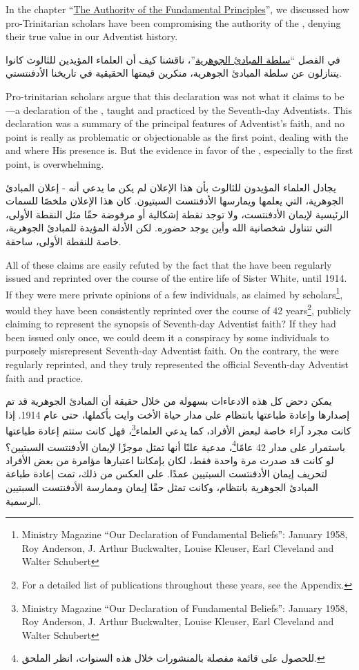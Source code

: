 In the chapter “\hyperref[chap:authority]{The Authority of the Fundamental Principles}”, we discussed how pro-Trinitarian scholars have been compromising the authority of the , denying their true value in our Adventist history.


في الفصل “\hyperref[chap:authority]{سلطة المبادئ الجوهرية}”، ناقشنا كيف أن العلماء المؤيدين للثالوث كانوا يتنازلون عن سلطة المبادئ الجوهرية، منكرين قيمتها الحقيقية في تاريخنا الأدفنتستي.


Pro-trinitarian scholars argue that this declaration was not what it claims to be—a declaration of the , taught and practiced by the Seventh-day Adventists. This declaration was a summary of the principal features of Adventist’s faith, and no point is really as problematic or objectionable as the first point, dealing with the  and where His presence is. But the evidence in favor of the , especially to the first point, is overwhelming.


يجادل العلماء المؤيدون للثالوث بأن هذا الإعلان لم يكن ما يدعي أنه - إعلان المبادئ الجوهرية، التي يعلمها ويمارسها الأدفنتست السبتيون. كان هذا الإعلان ملخصًا للسمات الرئيسية لإيمان الأدفنتست، ولا توجد نقطة إشكالية أو مرفوضة حقًا مثل النقطة الأولى، التي تتناول شخصانية الله وأين يوجد حضوره. لكن الأدلة المؤيدة للمبادئ الجوهرية، خاصة للنقطة الأولى، ساحقة.


All of these claims are easily refuted by the fact that the  have been regularly issued and reprinted over the course of the entire life of Sister White, until 1914. If they were mere private opinions of a few individuals, as claimed by scholars\footnote{Ministry Magazine “Our Declaration of Fundamental Beliefs”: January 1958, Roy Anderson, J. Arthur Buckwalter, Louise Kleuser, Earl Cleveland and Walter Schubert}, would they have been consistently reprinted over the course of 42 years\footnote{For a detailed list of publications throughout these years, see the Appendix.}, publicly claiming to represent the synopsis of Seventh-day Adventist faith? If they had been issued only once, we could deem it a conspiracy by some individuals to purposely misrepresent Seventh-day Adventist faith. On the contrary, the  were regularly reprinted, and they truly represented the official Seventh-day Adventist faith and practice.


يمكن دحض كل هذه الادعاءات بسهولة من خلال حقيقة أن المبادئ الجوهرية قد تم إصدارها وإعادة طباعتها بانتظام على مدار حياة الأخت وايت بأكملها، حتى عام 1914. إذا كانت مجرد آراء خاصة لبعض الأفراد، كما يدعي العلماء\footnote{Ministry Magazine “Our Declaration of Fundamental Beliefs”: January 1958, Roy Anderson, J. Arthur Buckwalter, Louise Kleuser, Earl Cleveland and Walter Schubert}، فهل كانت ستتم إعادة طباعتها باستمرار على مدار 42 عامًا\footnote{للحصول على قائمة مفصلة بالمنشورات خلال هذه السنوات، انظر الملحق.}، مدعية علنًا أنها تمثل موجزًا لإيمان الأدفنتست السبتيين؟ لو كانت قد صدرت مرة واحدة فقط، لكان بإمكاننا اعتبارها مؤامرة من بعض الأفراد لتحريف إيمان الأدفنتست السبتيين عمدًا. على العكس من ذلك، تمت إعادة طباعة المبادئ الجوهرية بانتظام، وكانت تمثل حقًا إيمان وممارسة الأدفنتست السبتيين الرسمية.


